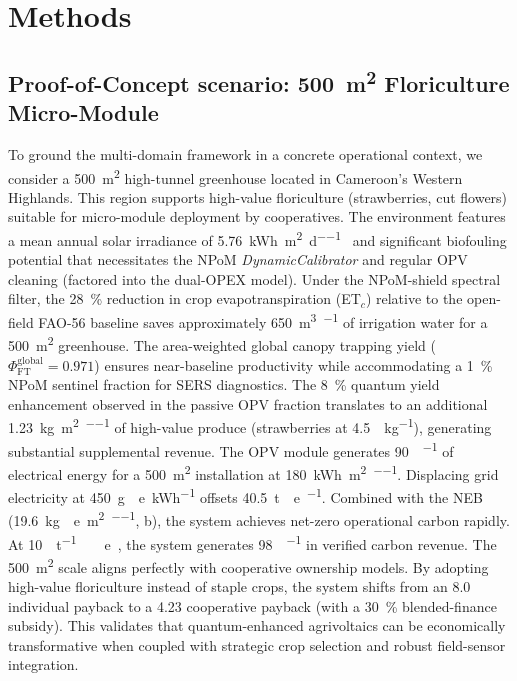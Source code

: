 \documentclass[onecolumn,a4paper,12pt]{article}
\begin{document}

\section*{Methods}

\subsection*{Proof-of-Concept scenario: \qty{500}{\m\squared} Floriculture Micro-Module}

To ground the multi-domain framework in a concrete operational context, we consider a \qty{500}{\m\squared} high-tunnel greenhouse located in Cameroon's Western Highlands. This region supports high-value floriculture (strawberries, cut flowers) suitable for micro-module deployment by cooperatives. The environment features a mean annual solar irradiance of \qty{5.76}{\kWh\per\m\squared\per\day}~\cite{FAO2022} and significant biofouling potential that necessitates the NPoM \textit{DynamicCalibrator} and regular OPV cleaning (factored into the dual-OPEX model). Under the NPoM-shield spectral filter, the \qty{28}{\percent} reduction in crop evapotranspiration (ET$_c$) relative to the open-field FAO-56 baseline saves approximately \qty{650}{\m\cubed\per\yr} of irrigation water for a \qty{500}{\m\squared} greenhouse. The area-weighted global canopy trapping yield ($\Phi_{\mathrm{FT}}^{\mathrm{global}} = 0.971$) ensures near-baseline productivity while accommodating a \qty{1}{\percent} NPoM sentinel fraction for SERS diagnostics. The \qty{8}{\percent} quantum yield enhancement observed in the passive OPV fraction translates to an additional \qty{1.23}{\kg\per\m\squared\per\yr} of high-value produce (strawberries at \qty{4.5}{\USD\per\kg}), generating substantial supplemental revenue. The OPV module generates \qty{90}{\MWh\per\yr} of electrical energy for a \qty{500}{\m\squared} installation at \qty{180}{\kWh\per\m\squared\per\yr}. Displacing grid electricity at \qty{450}{\g{}e\per\kWh} offsets \qty{40.5}{\tonne{}e\per\yr}. Combined with the NEB (\qty{19.6}{\kg{}e\per\m\squared\per\yr}, b), the system achieves net-zero operational carbon rapidly. At \qty{10}{\USD\per\tonne\ e}~\cite{ICVCM2024}, the system generates \qty{98}{\USD\per\yr} in verified carbon revenue. The \qty{500}{\m\squared} scale aligns perfectly with cooperative ownership models. By adopting high-value floriculture instead of staple crops, the system shifts from an \qty{8.0}{\yr} individual payback to a \qty{4.23}{\yr} cooperative payback (with a \qty{30}{\percent} blended-finance subsidy). This validates that quantum-enhanced agrivoltaics can be economically transformative when coupled with strategic crop selection and robust field-sensor integration.
\end{document}
